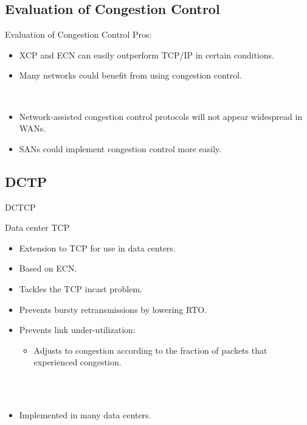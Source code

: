 \documentclass[english,aspectratio=43,t]{beamer}
\begin{document}
\subsection{Evaluation of Congestion Control}
\label{sec:eval}
\begin{frame}{Evaluation of Congestion Control}
Pros:
\begin{itemize}
\item XCP and ECN can easily outperform TCP/IP in certain conditions.
\item Many networks could benefit from using congestion control.
\end{itemize}
~\\
\begin{itemize}
\item<3->[$\Rightarrow$] Network-assisted congestion control protocols will not appear widespread in WANs.
\item<4->[$\Rightarrow$] SANs could implement congestion control more easily.
\end{itemize}
\end{frame}

\subsection{DCTP}
\label{sec:dctp}
\begin{frame}{DCTCP}
~\\
\begin{block}{Data center TCP}
\begin{itemize}
\item Extension to TCP for use in data centers.
\item Based on ECN.
\end{itemize}
\end{block}
\begin{itemize}
\item<2-> Tackles the TCP incast problem.
\item<3-> Prevents bursty retransmissions by lowering RTO.
\item<3-> Prevents link under-utilization:
\begin{itemize}
\item <4-> Adjusts to congestion according to the fraction of packets that experienced congestion.
\end{itemize}
~\\~\\
\item<5->[$\Rightarrow$] Implemented in many data centers.
\end{itemize}
\end{frame}
\end{document}
